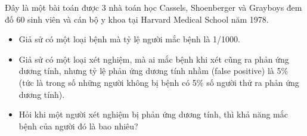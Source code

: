 \begin{frame}
     Đây là một bài toán được 3 nhà toán học Cassels, Shoenberger và Grayboys đem đố 60 sinh viên và cán bộ y khoa tại Harvard
Medical School năm 1978. 

  \begin{xrcs}
    \begin{itemize}
    \item Giả sử có một loại bệnh mà tỷ lệ người mắc bệnh là
      1/1000.
    \item Giả sử có một loại xét nghiệm, mà ai mắc bệnh khi xét
      cũng ra phản ứng dương tính, nhưng tỷ lệ phản ứng dương tính
      nhầm (false positive) là 5\% (tức là trong số những người không
      bị bệnh có 5\% số người thử ra phản ứng dương tính).
    \item Hỏi khi một
      người xét nghiệm bị phản ứng dương tính, thì khả năng mắc bệnh
      của người đó là bao nhiêu?
    \end{itemize}
  \end{xrcs}
\end{frame}







